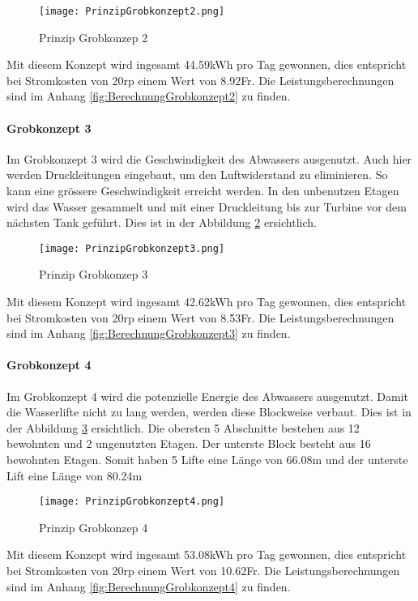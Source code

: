 \begin{figure} [H]
	\centering
	\texttt{[image: PrinzipGrobkonzept2.png]}
	\caption{Prinzip Grobkonzep 2}
	\label{fig:PrinzipGrobkonzept2}
\end{figure}

Mit diesem Konzept wird ingesamt 44.59\si{kWh} pro Tag gewonnen, dies entspricht bei Stromkosten von 20\si{rp} einem Wert von 8.92\si{Fr}. Die Leistungsberechnungen sind im Anhang \ref{fig:BerechnungGrobkonzept2}  zu finden.

\newpage

\paragraph{Grobkonzept 3}

Im Grobkonzept 3 wird die Geschwindigkeit des Abwassers ausgenutzt. Auch hier werden Druckleitungen eingebaut, um den Luftwiderstand zu eliminieren. So kann eine grössere Geschwindigkeit erreicht werden. In den unbenutzen Etagen wird das Wasser gesammelt und mit einer Druckleitung bis zur Turbine vor dem nächsten Tank geführt. Dies ist in der Abbildung \ref{fig:PrinzipGrobkonzept3}  ersichtlich. 

\begin{figure} [H]
	\centering
	\texttt{[image: PrinzipGrobkonzept3.png]}
	\caption{Prinzip Grobkonzep 3}
	\label{fig:PrinzipGrobkonzept3}
\end{figure}

Mit diesem Konzept wird ingesamt 42.62\si{kWh} pro Tag gewonnen, dies entspricht bei Stromkosten von 20\si{rp} einem Wert von 8.53\si{Fr}. Die Leistungsberechnungen sind im Anhang \ref{fig:BerechnungGrobkonzept3}  zu finden.

\newpage

\paragraph{Grobkonzept 4}

Im Grobkonzept 4 wird die potenzielle Energie des Abwassers ausgenutzt. Damit die Wasserlifte nicht zu lang werden, werden diese Blockweise verbaut. Dies ist in der Abbildung \ref{fig:PrinzipGrobkonzept4}  ersichtlich. Die obersten 5 Abschnitte bestehen aus 12 bewohnten und 2 ungenutzten Etagen. Der unterste Block besteht aus 16 bewohnten Etagen. Somit haben 5 Lifte eine Länge von 66.08\si{m} und der unterste Lift eine Länge von 80.24\si{m}

\begin{figure} [H]
	\centering
	\texttt{[image: PrinzipGrobkonzept4.png]}
	\caption{Prinzip Grobkonzep 4}
	\label{fig:PrinzipGrobkonzept4}
\end{figure}

Mit diesem Konzept wird ingesamt 53.08\si{kWh} pro Tag gewonnen, dies entspricht bei Stromkosten von 20\si{rp} einem Wert von 10.62\si{Fr}. Die Leistungsberechnungen sind im Anhang \ref{fig:BerechnungGrobkonzept4}  zu finden.

\newpage